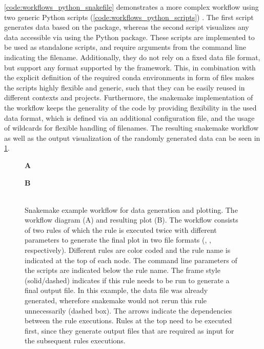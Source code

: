 \cref{code:workflows_python_snakefile} demonstrates a more complex workflow using two generic Python scripts (\cref{code:workflows_python_scripts}) . The first script generates data based on the  package, whereas the second script visualizes any data accessible via  using the Python  package. These scripts are implemented to be used as standalone scripts, and require arguments from the command line indicating the filename. Additionally, they do not rely on a fixed data file format, but support any format supported by the   framework. This, in combination with the explicit definition of the required conda environments in form of  files makes the scripts highly flexible and generic, such that they can be easily reused in different contexts and projects. Furthermore, the snakemake implementation of the workflow keeps the generality of the code by providing flexibility in the used data format, which is defined via an additional configuration  file, and the usage of wildcards for flexible handling of filenames. The resulting snakemake workflow as well as the output visualization of the randomly generated data can be seen in \cref{fig:python_demo}.

\begin{figure}
    \begin{minipage}[t]{0.4\textwidth}
    \textbf{A}\\
    
    \end{minipage}
    \begin{minipage}[t]{0.6\textwidth}
    \textbf{B}\\
    \\
    \end{minipage}
 \caption[Snakemake example workflow for data generation and plotting]{Snakemake example workflow for data generation and plotting. The workflow diagram (A) and resulting plot (B). The workflow consists of two rules of which the  rule is executed twice with different parameters to generate the final plot in two file formats (, , respectively). Different rules are color coded and the rule name is indicated at the top of each node.  The command line parameters of the scripts are indicated below the rule name. The frame style (solid/dashed) indicates if this rule needs to be run to generate a final output file. In this example, the data file was already generated, wherefore snakemake would not rerun this rule unnecessarily (dashed box). The arrows indicate the dependencies between the rule executions. Rules at the top need to be executed first, since they generate output files that are required as input for the subsequent rules executions.}
\label{fig:python_demo}
\end{figure}


